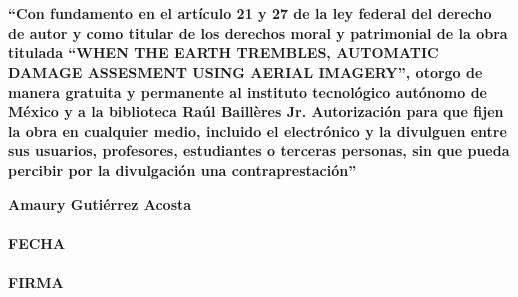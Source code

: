 \begin{titlepage}

\hfill\\
\hfill\\


\vspace{4cm}

\textbf{ ``Con fundamento en el art\'iculo 21 y 27 de la ley federal del derecho de autor y como titular de los derechos moral y patrimonial de la obra titulada ``WHEN THE EARTH TREMBLES, AUTOMATIC DAMAGE ASSESMENT USING AERIAL IMAGERY'', otorgo de manera gratuita y permanente al instituto tecnol\'ogico aut\'onomo de M\'exico y a la biblioteca Ra\'ul Baill\`eres Jr. Autorizaci\'on para que fijen la obra en cualquier medio, incluido el electr\'onico y la divulguen entre sus usuarios, profesores, estudiantes o terceras personas, sin que pueda percibir por la divulgaci\'on una contraprestaci\'on''}

\vspace{1cm}
\begin{center}
\textbf{Amaury Guti\'errez Acosta}\\
\makebox[2in]{\hrulefill}\\
\textbf{FECHA}\\
\makebox[2in]{\hrulefill}\\
\textbf{FIRMA}\\
\end{center}
\medskip




\end{titlepage}
\endinput